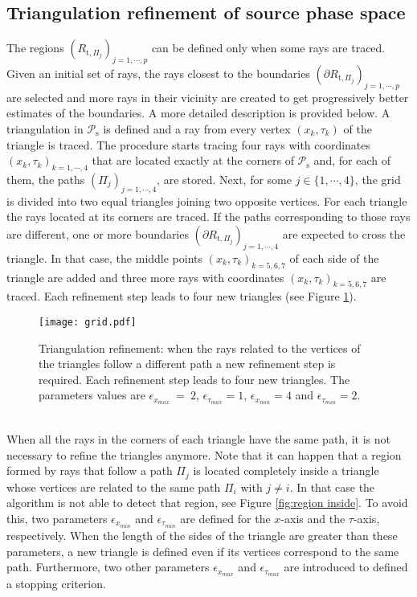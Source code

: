 \subsection{Triangulation refinement of source phase space} \label{subsec:triangulation1}
The regions $(R_{\textrm{t}, \Pi_j})_{j =1, \cdots, p}$ can be defined only when some rays are traced.
Given an initial set of rays, the rays closest to the boundaries $(\partial R_{\textrm{t}, \Pi_j})_{j = 1, \cdots, p}$ are selected and more rays in their vicinity are created to get progressively better estimates of the boundaries. A more detailed description is provided below.
A triangulation in $\mathcal{P}_\textrm{s}$ is defined and a ray from every vertex $(x_k, \tau_k)$ of the triangle is traced.
The procedure starts tracing four rays with coordinates $(x_k,\tau_k)_{k=1, \cdots, 4}$ that are located exactly at the corners of $\mathcal{P}_\textrm{s}$ and, for each of them, the paths $(\Pi_{j})_{j = 1, \cdots, 4}$, are stored. Next, for some $j \in\{1, \cdots, 4\}$, the grid is divided into two equal triangles joining two opposite vertices. For each triangle the rays located at its corners are traced. If the paths corresponding to
those rays are different, one or more boundaries
$(\partial R_{\textrm{t}, \Pi_j})_{j =1, \cdots, 4}$ are expected to cross the triangle.
In that case, the middle points $(x_k, \tau_k)_{k = 5, 6, 7}$ of each side of the triangle are added and
three more rays with coordinates $(x_k, \tau_k)_{k = 5, 6,7}$ are traced. Each refinement step leads to four new triangles (see Figure \ref{fig:refinement}).
 \begin{figure}[t]
  \begin{center}
  \texttt{[image: grid.pdf]}
  \end{center}
  \caption{\footnotesize{Triangulation refinement:
  when the rays related to the vertices of the triangles follow a different path a new refinement step is required.
   Each refinement step leads to four new triangles.
   The parameters values are $\epsilon_{x_{max}}~=~ 2$, $\epsilon_{\tau_{max}}= 1$, $\epsilon_{x_{min}}= 4$ and $\epsilon_{\tau_{min}}=2$.   }}
  \label{fig:refinement}
\end{figure}
  \\
 \indent
When all the rays in the corners of each triangle have the same path, it is not necessary to refine the triangles anymore.
\noindent Note that it can happen that a region formed by rays that follow a path $\Pi_j$ is located completely inside a triangle whose vertices are related to the same path $\Pi_i$ with $j \neq i$. In that case the algorithm is not able to detect that region, see Figure \ref{fig:region inside}. To avoid this, two parameters $\epsilon_{x_{min}}$ and $\epsilon_{\tau_{min}}$ are defined for the $x$-axis and the $\tau$-axis, respectively. When the length of the sides of the triangle are greater than these parameters, a new triangle is defined even if its vertices correspond to the same path. Furthermore, two other parameters $\epsilon_{x_{max}}$ and $\epsilon_{\tau_{max}}$ are introduced to defined a stopping criterion.
